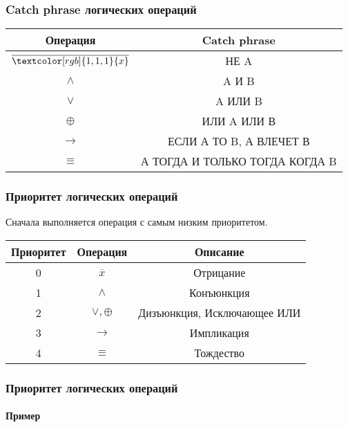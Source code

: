 \begin{frame}
\frametitle{Catch phrase логических операций}


\begin{center}
\begin{tabular}{|c|c|}
\hline 
Операция & Catch phrase \tabularnewline
\hline 
\hline 
$\overline{\textcolor[rgb]{1,1,1}{x}}$ & НЕ A \pause \tabularnewline 
\hline 
$\wedge$ & A И B \pause \tabularnewline 
\hline 
$\vee$ & A ИЛИ B  \pause \tabularnewline 
\hline 
$\oplus$ & ИЛИ A ИЛИ В \pause \tabularnewline 
\hline 
$\rightarrow$ & ЕСЛИ А ТО B, А ВЛЕЧЕТ В  \pause \tabularnewline
\hline 
$\equiv$ & А ТОГДА И ТОЛЬКО ТОГДА КОГДА B \tabularnewline  
\hline 
\end{tabular}\end{center}
\end{frame}

\begin{frame}
\frametitle{Приоритет логических операций}

Сначала выполняется операция с самым низким приоритетом.
\begin{center}
\begin{tabular}{|c|c|c|}
\hline 
Приоритет & Операция & Описание\tabularnewline
\hline 
0 & $\overline{x}$ & Отрицание \tabularnewline
\hline 
1 & $\wedge$ & Конъюнкция\tabularnewline
\hline 
2 & $\vee,\oplus$ & Дизъюнкция, Исключающее ИЛИ\tabularnewline
\hline 
3 & $\rightarrow$ & Импликация \tabularnewline
\hline 
4 & $\equiv$ & Тождество\tabularnewline
\hline 
\end{tabular}
\end{center}
\end{frame}

\begin{frame}
\frametitle{Приоритет логических операций}
\framesubtitle{Пример}


\end{frame}




